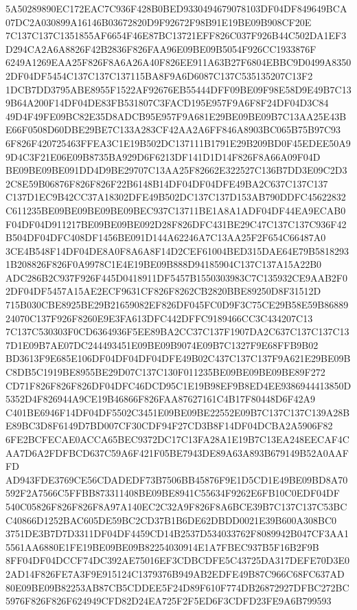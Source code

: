 \documentclass[UTF8,fontset=fandol,zihao=-4,a4paper]{ctexart}
\begin{document}
{{5A50289890EC172EAC7C936F428B0BED9330494679078103DF04DF849649BCA07DC2A030899A16146B03672820D9F92672F98B91E19BE09B908CF20E
7C137C137C1351855AF6654F46E87BC13721EFF826C037F926B44C502DA1EF3D294CA2A6A8826F42B2836F826FAA96E09BE09B5054F926CC1933876F
6249A1269EAA25F826F8A6A26A40F826EE911A63B27F6804EBBC9D0499A83502DF04DF5454C137C137C137115BA8F9A6D6087C137C535135207C13F2
1DCB7DD3795ABE8955F1522AF92676EB55444DFF09BE09F98E58D9E49B7C139B64A200F14DF04DE83FB531807C3FACD195E957F9A6F8F24DF04D3C84
49D4F49FE09BC82E35D8ADCB95E957F9A681E29BE09BE09B7C13AA25E43BE66F0508D60DBE29BE7C133A283CF42AA2A6FF846A8903BC065B75B97C93
6F826F420725463FFEA3C1E19B502DC137111B1791E29B209BD0F45EDEE50A99D4C3F21E06E09B8735BA929D6F6213DF141D1D14F826F8A66A09F04D
BE09BE09BE091DD4D9BE29707C13AA25F82662E322527C136B7DD3E09C2D32C8E59B06876F826F826F22B6148B14DF04DF04DFE49BA2C637C137C137
C137D1EC9B42CC37A18302DFE49B502DC137C137D153AB790DDFC45622832C611235BE09BE09BE09BE09BEC937C13711BE1A8A1ADF04DF44EA9ECAB0
F04DF04D911217BE09BE09BE092D28F826DFC431BE29C47C137C137C936F42B504DF04DFC408DF1456BE091D144A62246A7C13AA25F2F654C66487A0
3CE4B548F14DF04DE8A0F8A6A8F14D2CEF61004BED315DAE64E79B58182931B208826F826F0A9978C1E4E19BE09B888D94185904C137C137A15A22B0
ADC286B2C937F926F445D0418911DF5457B1550303983C7C135932CE9AAB2F02DF04DF5457A15AE2ECF9631CF826F8262CB2820BBE89250D8F31512D
715B030CBE8925BE29B21659082EF826DF045FC0D9F3C75CE29B58E59B8688924070C137F926F8260E9E3FA613DFC442DFFC9189466CC3C434207C13
7C137C530303F0CD6364936F5EE89BA2CC37C137F1907DA2C637C137C137C137D1E09B7AE07DC244493451E09BE09B9074E09B7C1327F9E68FFB9B02
BD3613F9E685E106DF04DF04DF04DFE49B02C437C137C137F9A621E29BE09BC8DB5C1919BE8955BE29D07C137C130F011235BE09BE09BE09BE89F272
CD71F826F826F826DF04DFC46DCD95C1E19B98EF9B8ED4EE9386944413850D5352D4F826944A9CE19B46866F826FAA87627161C4B17F80448D6F42A9
C401BE6946F14DF04DF5502C3451E09BE09BE22552E09B7C137C137C139A28BE89BC3D8F6149D7BD007CF30CDF94F27CD3B8F14DF04DCBA2A5906F82
6FE2BCFECAE0ACCA65BEC9372DC17C13FA28A1E19B7C13EA248EECAF4CAA7D6A2FDFBCD637C59A6F421F05BE7943DE89A63A893B679149B52A0AAFFD
AD943FDE3769CE56CDADEDF73B7506BB45876F9E1D5CD1E49BE09BD8A70592F2A7566C5FFBB873311408BE09BE8941C55634F9262E6FB10C0EDF04DF
540C05826F826F826F8A97A140EC2C32A9F826F8A6BCE39B7C137C137C53BCC40866D1252BAC605DE59BC2CD37B1B6DE62DBDD0021E39B600A308BC0
3751DE3B7D7D3311DF04DF4459CD14B2537D534033762F8089942B047CF3AA15561AA6880E1FE19BE09BE09B82254030914E1A7FBEC937B5F16B2F9B
8FF04DF04DCCF74DC392AE75016EF3CDBCDFE5C43725DA317DEFE70D3E02AD14F826FE7A3F9E915124C1379376B949AB2EDFE49B87C966C68FC637AD
80E09BE09B82253AB87CB5CDDEE5F24D89F610F774DB26872927DFBC272BC5976F826F826F624949CFD82D24EA725F2F5ED6F3CDFD23FE9A6B799593
}}
\end{document}
